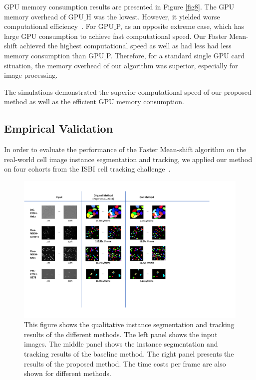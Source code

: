 \documentclass[journal,twoside,web]{ieeecolor}
\begin{document}
GPU memory consumption results are presented in Figure \ref{fig8}. The GPU memory overhead of GPU$\_$H was the lowest. However, it yielded worse computational efficiency~\cite{b19}. For GPU$\_$P, as an opposite extreme case, which has large GPU consumption to achieve fast computational speed. Our Faster Mean-shift achieved the highest computational speed as well as had less had less memory consumption than GPU$\_$P. Therefore, for a standard single GPU card situation, the memory overhead of our algorithm was superior, especially for image processing. 

The simulations demonstrated the superior computational speed of our proposed method as well as the efficient GPU memory consumption.

\subsection{Empirical Validation}
In order to evaluate the performance of the Faster Mean-shift algorithm on the real-world cell image instance segmentation and tracking, we applied our method on four cohorts from the ISBI cell tracking challenge~\cite{b20}. 

\begin{figure}[t]
\includegraphics[width=6.5 in]{5.pdf}
\centering
\caption{This figure shows the qualitative instance segmentation and tracking results of the different methods. The left panel shows the input images. The middle panel shows the instance segmentation and tracking results of the baseline method. The right panel presents the results of the proposed method. The time costs per frame are also shown for different methods. }
\label{fig5}
\end{figure}
\end{document}
